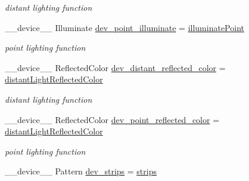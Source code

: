 \begin{DoxyCompactItemize}
\begin{DoxyCompactList}\small\item\em distant lighting function \end{DoxyCompactList}\item 
\+\_\+\+\_\+device\+\_\+\+\_\+ Illuminate \hyperlink{group__device__pointers_ga9fb3abd281c9d4d00e477db4055e3111}{dev\+\_\+point\+\_\+illuminate} = \hyperlink{group__intersection__test__prperties_gab3c663df5b5a29d04083e7793bce50d5}{illuminate\+Point}\hypertarget{group__device__pointers_ga9fb3abd281c9d4d00e477db4055e3111}{}\label{group__device__pointers_ga9fb3abd281c9d4d00e477db4055e3111}

\begin{DoxyCompactList}\small\item\em point lighting function \end{DoxyCompactList}\item 
\+\_\+\+\_\+device\+\_\+\+\_\+ Reflected\+Color \hyperlink{group__device__pointers_ga3efd041b094f1b7a7c031d9c244a0630}{dev\+\_\+distant\+\_\+reflected\+\_\+color} = \hyperlink{group__intersection__test__prperties_ga19abb6bc50199d8583aafedd0e044b7e}{distant\+Light\+Reflected\+Color}\hypertarget{group__device__pointers_ga3efd041b094f1b7a7c031d9c244a0630}{}\label{group__device__pointers_ga3efd041b094f1b7a7c031d9c244a0630}

\begin{DoxyCompactList}\small\item\em distant lighting function \end{DoxyCompactList}\item 
\+\_\+\+\_\+device\+\_\+\+\_\+ Reflected\+Color \hyperlink{group__device__pointers_ga59eceb819291c7ca1e66b767a7253dc8}{dev\+\_\+point\+\_\+reflected\+\_\+color} = \hyperlink{group__intersection__test__prperties_ga19abb6bc50199d8583aafedd0e044b7e}{distant\+Light\+Reflected\+Color}\hypertarget{group__device__pointers_ga59eceb819291c7ca1e66b767a7253dc8}{}\label{group__device__pointers_ga59eceb819291c7ca1e66b767a7253dc8}

\begin{DoxyCompactList}\small\item\em point lighting function \end{DoxyCompactList}\item 
\+\_\+\+\_\+device\+\_\+\+\_\+ Pattern \hyperlink{group__device__pointers_ga2efdb7a5e4237c7f66bf1b71f1839335}{dev\+\_\+strips} = \hyperlink{group__intersection__test__prperties_gae0b690ff7b5f9b93e53bb0c1437fbf55}{strips}\hypertarget{group__device__pointers_ga2efdb7a5e4237c7f66bf1b71f1839335}{}\label{group__device__pointers_ga2efdb7a5e4237c7f66bf1b71f1839335}


\end{DoxyCompactItemize}
